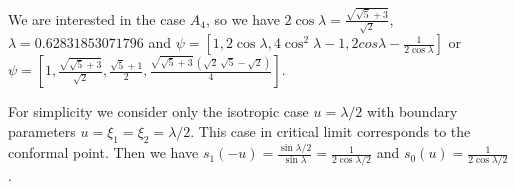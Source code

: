 \documentclass[12pt]{article}
\begin{document}





  We are interested in the case $A_4$, so we have
$2\cos\lambda=\frac{\sqrt{\sqrt{5}+3}}{\sqrt{2}}$,
$\lambda=0.62831853071796$ and $\psi=\left[1,2\cos\lambda,
  4\cos^2\lambda-1, 2cos\lambda-\frac{1}{2\cos\lambda}\right]$ or $\psi=\left[1,\frac{\sqrt{\sqrt{5}+3}}{\sqrt{2}},\frac{\sqrt{5}+1}{2},\frac{\sqrt{\sqrt{5}+3}\,\left( \sqrt{2}\,\sqrt{5}-\sqrt{2}\right) }{4}\right]$.

For simplicity we consider only the isotropic case $u=\lambda/2$ with boundary parameters
$u=\xi_1=\xi_2=\lambda/2$. This case in critical limit corresponds to the  conformal point. Then we have
$s_1(-u)=\frac{\sin\lambda/2}{\sin\lambda}=\frac{1}{2\cos\lambda/2}$ and $s_0(u)=\frac{1}{2\cos\lambda/2}$.
\end{document}
